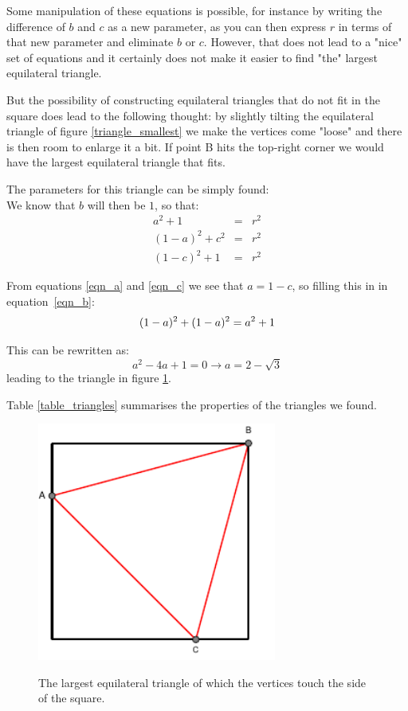 \documentclass[onecolumn]{article}
\begin{document}
Some manipulation of these equations is possible, for instance by writing the difference of $b$ and $c$ as a new parameter,
as you can then express $r$ in terms of that new parameter and eliminate $b$ or $c$. However, that does not lead to
a "nice" set of equations and it certainly does not make it easier to find "the" largest equilateral triangle.

But the possibility of constructing equilateral triangles that do not fit in the square does lead to the following
thought: by slightly tilting the equilateral triangle of figure \ref{triangle_smallest} we make the vertices come "loose"
and there is then room to enlarge it a bit. If point B hits the top-right corner we would have the largest equilateral
triangle that fits.

The parameters for this triangle can be simply found: \\
\noindent We know that $b$ will then be $1$, so that:
\begin{eqnarray}
\label{eqn_a}  a^2 + 1 &=& r^2 \\
\label{eqn_b} (1-a)^2 + c^2 &=& r^2 \\
\label{eqn_c} (1-c)^2 + 1 &=& r^2
\end{eqnarray}

From equations \ref{eqn_a} and \ref{eqn_c} we see that $a = 1 - c$, so filling this in in equation~\ref{eqn_b}:
\begin{equation}
(1-a)^2 + (1-a)^2 = a^2 + 1\\
\end{equation}

This can be rewritten as:
\begin{equation}
 a^2 - 4a + 1 = 0 \longrightarrow a = 2 - \sqrt{3}
\end{equation}
\noindent leading to the triangle in figure \ref{triangle_largest}.

Table \ref{table_triangles} summarises the properties of the triangles we found.

\begin{figure}[h]
\begin{center}
\caption{The largest equilateral triangle of which the vertices touch the side of the square.}
\includegraphics[width=0.7\textwidth]{triangle_largest.pdf}
\label{triangle_largest}
\end{center}
\end{figure}
\end{document}
